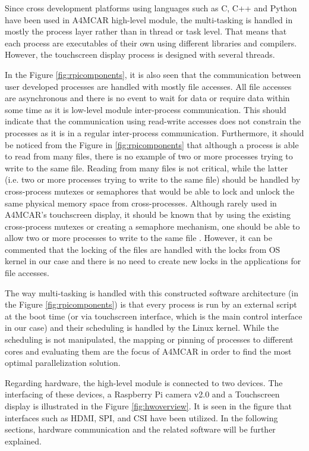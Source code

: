 Since cross development platforms using languages such as C, C++ and Python have been used in A4MCAR high-level module, the multi-tasking is handled in mostly the process layer rather than in thread or task level. That means that each process are executables of their own using different libraries and compilers. However, the touchscreen display process is designed with several threads.

In the Figure \ref{fig:rpicomponents}, it is also seen that the communication between user developed processes are handled with mostly file accesses. All file accesses are asynchronous and there is no event to wait for data or require data within some time as it is low-level module inter-process communication. This should indicate that the communication using read-write accesses does not constrain the processes as it is in a regular inter-process communication. Furthermore, it should be noticed from the Figure in \ref{fig:rpicomponents} that although a process is able to read from many files, there is no example of two or more processes trying to write to the same file. Reading from many files is not critical, while the latter (i.e. two or more processes trying to write to the same file) should be handled by cross-process mutexes or semaphores that would be able to lock and unlock the same physical memory space from cross-processes. Although rarely used in A4MCAR's touchscreen display, it should be known that by using the existing cross-process mutexes or creating a semaphore mechanism, one should be able to allow two or more processes to write to the same file \cite{linuxkernelbook}. However, it can be commented that the locking of the files are handled with the locks from OS kernel in our case and there is no need to create new locks in the applications for file accesses. 

The way multi-tasking is handled with this constructed software architecture (in the Figure \ref{fig:rpicomponents}) is that every process is run by an external script at the boot time (or via touchscreen interface, which is the main control interface in our case) and their scheduling is handled by the Linux kernel. While the scheduling is not manipulated, the mapping or pinning of processes to different cores and evaluating them are the focus of A4MCAR in order to find the most optimal parallelization solution.

Regarding hardware, the high-level module is connected to two devices. The interfacing of these devices, a Raspberry Pi camera v2.0 and a Touchscreen display is illustrated in the Figure \ref{fig:hwoverview}. It is seen in the figure that interfaces such as HDMI, SPI, and CSI have been utilized. In the following sections, hardware communication and the related software will be further explained.

